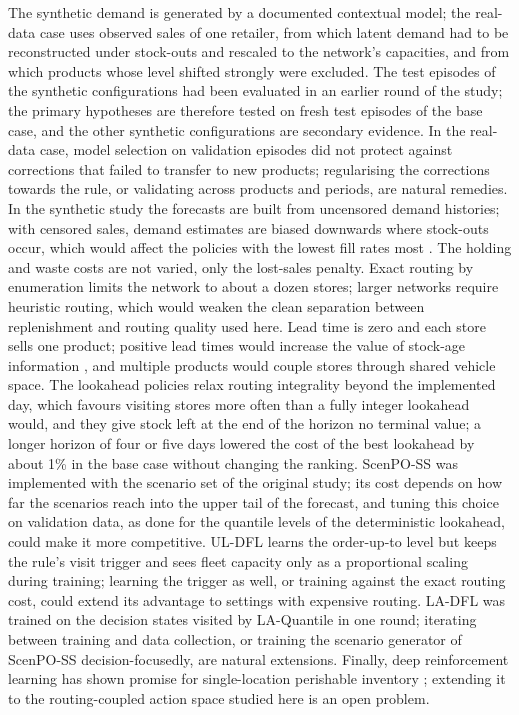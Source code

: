 The synthetic demand is generated by a documented contextual model; the real-data case uses observed sales of one retailer, from which latent demand had to be reconstructed under stock-outs and rescaled to the network's capacities, and from which products whose level shifted strongly were excluded. The test episodes of the synthetic configurations had been evaluated in an earlier round of the study; the primary hypotheses are therefore tested on fresh test episodes of the base case, and the other synthetic configurations are secondary evidence. In the real-data case, model selection on validation episodes did not protect against corrections that failed to transfer to new products; regularising the corrections towards the rule, or validating across products and periods, are natural remedies. In the synthetic study the forecasts are built from uncensored demand histories; with censored sales, demand estimates are biased downwards where stock-outs occur, which would affect the policies with the lowest fill rates most \citep{sachs2014data}. The holding and waste costs are not varied, only the lost-sales penalty. Exact routing by enumeration limits the network to about a dozen stores; larger networks require heuristic routing, which would weaken the clean separation between replenishment and routing quality used here. Lead time is zero and each store sells one product; positive lead times would increase the value of stock-age information \citep{broekmeulen2009heuristic}, and multiple products would couple stores through shared vehicle space. The lookahead policies relax routing integrality beyond the implemented day, which favours visiting stores more often than a fully integer lookahead would, and they give stock left at the end of the horizon no terminal value; a longer horizon of four or five days lowered the cost of the best lookahead by about 1\% in the base case without changing the ranking. ScenPO-SS was implemented with the scenario set of the original study; its cost depends on how far the scenarios reach into the upper tail of the forecast, and tuning this choice on validation data, as done for the quantile levels of the deterministic lookahead, could make it more competitive. UL-DFL learns the order-up-to level but keeps the rule's visit trigger and sees fleet capacity only as a proportional scaling during training; learning the trigger as well, or training against the exact routing cost, could extend its advantage to settings with expensive routing. LA-DFL was trained on the decision states visited by LA-Quantile in one round; iterating between training and data collection, or training the scenario generator of ScenPO-SS decision-focusedly, are natural extensions. Finally, deep reinforcement learning has shown promise for single-location perishable inventory \citep{demoor2022reward,temizoz2025deep}; extending it to the routing-coupled action space studied here is an open problem.

